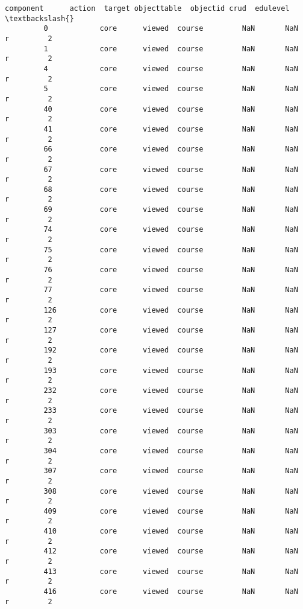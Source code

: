 \documentclass[11pt]{article}
\begin{document}
\begin{Verbatim}[commandchars=\\\{\}]
                 component      action  target objecttable  objectid crud  edulevel  \textbackslash{}
         0            core      viewed  course         NaN       NaN    r         2   
         1            core      viewed  course         NaN       NaN    r         2   
         4            core      viewed  course         NaN       NaN    r         2   
         5            core      viewed  course         NaN       NaN    r         2   
         40           core      viewed  course         NaN       NaN    r         2   
         41           core      viewed  course         NaN       NaN    r         2   
         66           core      viewed  course         NaN       NaN    r         2   
         67           core      viewed  course         NaN       NaN    r         2   
         68           core      viewed  course         NaN       NaN    r         2   
         69           core      viewed  course         NaN       NaN    r         2   
         74           core      viewed  course         NaN       NaN    r         2   
         75           core      viewed  course         NaN       NaN    r         2   
         76           core      viewed  course         NaN       NaN    r         2   
         77           core      viewed  course         NaN       NaN    r         2   
         126          core      viewed  course         NaN       NaN    r         2   
         127          core      viewed  course         NaN       NaN    r         2   
         192          core      viewed  course         NaN       NaN    r         2   
         193          core      viewed  course         NaN       NaN    r         2   
         232          core      viewed  course         NaN       NaN    r         2   
         233          core      viewed  course         NaN       NaN    r         2   
         303          core      viewed  course         NaN       NaN    r         2   
         304          core      viewed  course         NaN       NaN    r         2   
         307          core      viewed  course         NaN       NaN    r         2   
         308          core      viewed  course         NaN       NaN    r         2   
         409          core      viewed  course         NaN       NaN    r         2   
         410          core      viewed  course         NaN       NaN    r         2   
         412          core      viewed  course         NaN       NaN    r         2   
         413          core      viewed  course         NaN       NaN    r         2   
         416          core      viewed  course         NaN       NaN    r         2   

\end{Verbatim}
\end{document}
